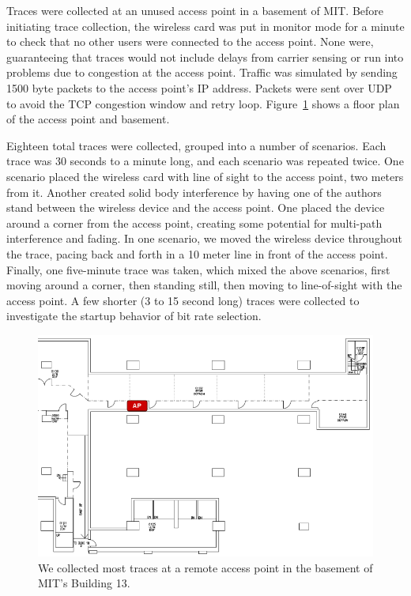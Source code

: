 \documentclass[twocolumn,10pt]{article}
\begin{document}
Traces were collected at an unused access point in a basement of MIT.
Before initiating trace collection, the wireless card was put in
monitor mode for a minute to check that no other users were connected
to the access point.  None were, guaranteeing that traces would not
include delays from carrier sensing or run into problems due to
congestion at the access point.  Traffic was simulated by sending 1500
byte packets to the access point's IP address.  Packets were sent over
UDP to avoid the TCP congestion window and retry loop. Figure~\ref{figure:1} 
shows a floor plan of the access point and basement.

Eighteen total traces were collected, grouped into a number of
scenarios.  Each trace was 30 seconds to a minute long, and each
scenario was repeated twice.  One scenario placed the wireless card
with line of sight to the access point, two meters from it.  Another
created solid body interference by having one of the authors stand
between the wireless device and the access point.  One placed the
device around a corner from the access point, creating some potential
for multi-path interference and fading.  In one scenario, we moved the
wireless device throughout the trace, pacing back and forth in a 10
meter line in front of the access point.  Finally, one five-minute
trace was taken, which mixed the above scenarios, first moving around
a corner, then standing still, then moving to line-of-sight with the
access point.  A few shorter (3 to 15 second long) traces were
collected to investigate the startup behavior of bit rate selection.

\begin{figure}[htbp]
  \centering
  \includegraphics[width=\linewidth]{bsmt13floorplan.png}
  \caption{We collected most traces at a remote access point in the
    basement of MIT's Building 13.}
\label{figure:1}
\end{figure}
\end{document}
